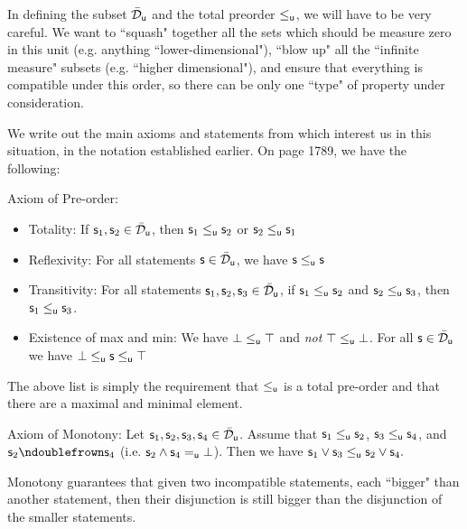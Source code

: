 \documentclass[10pt, onecolumn, longbibliography, nofootinbib]{revtex4-2}
\begin{document}
\begin{remark}
In defining the subset $\tdomain_{\stmt[u]}$ and the total preorder $\leq_{\stmt[u]}$, we will have to be very careful. We want to ``squash" together all the sets which should be measure zero in this unit (e.g. anything ``lower-dimensional"), ``blow up" all the ``infinite measure" subsets (e.g. ``higher dimensional"), and ensure that everything is compatible under this order, so there can be only one ``type" of property under consideration. 
\end{remark}

We write out the main axioms and statements from \cite{villegas} which interest us in this situation, in the notation established earlier. On page 1789, we have the following:

Axiom of Pre-order:
\begin{itemize}
    \item Totality: If $\stmt_1,\stmt_2\in \tdomain_{\stmt[u]}$, then $\stmt_1 \leq_{\stmt[u]} \stmt_2$ or $\stmt_2\leq_{\stmt[u]} \stmt_1$
    \item Reflexivity: For all statements $\stmt\in \tdomain_{\stmt[u]}$, we have $\stmt\leq_{\stmt[u]}\stmt$
    \item Transitivity: For all statements $\stmt_1,\stmt_2,\stmt_3\in \tdomain_{\stmt[u]}$, if $\stmt_1\leq_{\stmt[u]}\stmt_2$ and $\stmt_2\leq_{\stmt[u]}\stmt_3$, then $\stmt_1\leq_{\stmt[u]}\stmt_3$.
    \item Existence of max and min: We have $\impossibility\leq_{\stmt[u]}\certainty$ and \emph{not} $\certainty\leq_{\stmt[u]}\impossibility$. For all $\stmt\in \tdomain_{\stmt[u]}$ we have $\impossibility\leq_{\stmt[u]}\stmt\leq_{\stmt[u]}\certainty$
\end{itemize}

The above list is simply the requirement that $\leq_{\stmt[u]}$ is a total pre-order and that there are a maximal and minimal element. 


Axiom of Monotony: 
Let $\stmt_1,\stmt_2,\stmt_3,\stmt_4\in \tdomain_{\stmt[u]}$. Assume that $\stmt_1\leq_{\stmt[u]} \stmt_2$, $\stmt_3\leq_{\stmt[u]} \stmt_4$, and $\stmt_2\ncomp \stmt_4$ (i.e. $\stmt_2\AND \stmt_4 =_{\stmt[u]} \impossibility$). Then we have $\stmt_1\OR \stmt_3 \leq_{\stmt[u]} \stmt_2\OR \stmt_4.$

Monotony guarantees that given two incompatible statements, each ``bigger" than another statement, then their disjunction is still bigger than the disjunction of the smaller statements. 
\end{document}

